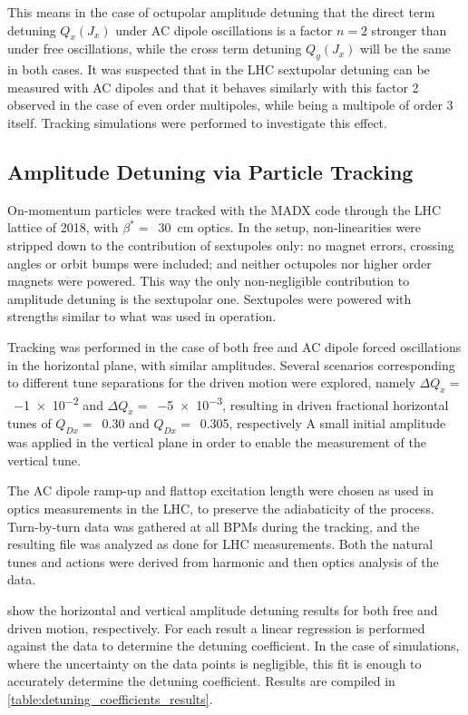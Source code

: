 This means in the case of octupolar amplitude detuning that the direct term detuning \(Q_{x}(J_{x})\) under AC dipole oscillations is a factor \(n = 2\) stronger than under free oscillations, while the cross term detuning \(Q_{y}(J_{x})\) will be the same in both cases.
It was suspected that in the LHC sextupolar detuning can be measured with AC dipoles and that it behaves similarly with this factor \num{2} observed in the case of even order multipoles, while being a multipole of order \num{3} itself.
Tracking simulations were performed to investigate this effect.

\subsection*{Amplitude Detuning via Particle Tracking}

On-momentum particles were tracked with the \gls{MADX} code through the \gls{LHC} lattice of \num{2018}, with \(\beta^{\ast} =\)~\qty{30}{\centi\meter} optics.
In the setup, non-linearities were stripped down to the contribution of sextupoles only: no magnet errors, crossing angles or orbit bumps were included; and neither octupoles nor higher order magnets were powered.
This way the only non-negligible contribution to amplitude detuning is the sextupolar one.
Sextupoles were powered with strengths similar to what was used in operation.

Tracking was performed in the case of both free and AC dipole forced oscillations in the horizontal plane, with similar amplitudes.
Several scenarios corresponding to different tune separations for the driven motion were explored, namely \(\Delta Q_x =\)~\num{-1e-2} and \(\Delta Q_x =\)~\num{-5e-3}, resulting in driven fractional horizontal tunes of \(Q_{Dx} =\)~\num{0.30} and \(Q_{Dx} =\)~\num{0.305}, respectively
A small initial amplitude was applied in the vertical plane in order to enable the measurement of the vertical tune.

The AC dipole ramp-up and flattop excitation length were chosen as used in optics measurements in the LHC, to preserve the adiabaticity of the process.
Turn-by-turn data was gathered at all \glspl{BPM} during the tracking, and the resulting file was analyzed as done for LHC measurements.
Both the natural tunes and actions were derived from harmonic and then optics analysis of the data.

 show the horizontal and vertical amplitude detuning results for both free and driven motion, respectively.
For each result a linear regression is performed against the data to determine the detuning coefficient.
In the case of simulations, where the uncertainty on the data points is negligible, this fit is enough to accurately determine the detuning coefficient.
Results are compiled in \cref{table:detuning_coefficients_results}.
\newpage

